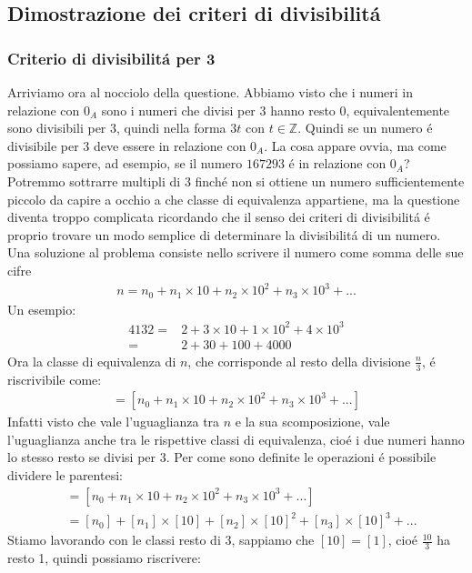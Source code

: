 \documentclass[twoside]{article} %
\begin{document}
	\subsection{Dimostrazione dei criteri di divisibilit\'a}
	\subsubsection{Criterio di divisibilit\'a per 3}
	Arriviamo ora al nocciolo della questione. Abbiamo visto che i numeri in relazione con $0_A$ sono i numeri che divisi per $3$ hanno resto 0, equivalentemente sono divisibili per $3$, quindi nella forma $3t$ con $t\in \mathbb{Z}$. Quindi se  un numero \'e divisibile per $3$ deve essere in relazione con $0_A$. La cosa appare ovvia, ma come possiamo sapere, ad esempio, se il numero $167293$ \'e in relazione con $0_A$? Potremmo sottrarre multipli di 3 finch\'e non si ottiene un numero sufficientemente piccolo da capire a occhio a che classe di equivalenza appartiene, ma la questione diventa troppo complicata ricordando che il senso dei criteri di divisibilit\'a \'e proprio trovare un modo semplice di determinare la divisibilit\'a di un numero. Una soluzione al problema consiste nello scrivere il numero come somma delle sue cifre
	\begin{gather*}
		n=n_0+n_1\times 10+n_2\times 10^2+n_3\times 10^3+...
	\end{gather*} 
	Un esempio:
	\begin{align*}
		4132=&2+3\times 10+1\times 10^2+4\times 10^3\\
		=&2+30+100+4000
	\end{align*} 
	Ora la classe di equivalenza di $n$, che corrisponde al resto della divisione $\frac{n}{3}$, \'e riscrivibile come:
	\begin{gather*}
		[n]=[n_0+n_1\times 10+n_2\times 10^2+n_3\times 10^3+...]
	\end{gather*}
	Infatti visto che vale l'uguaglianza tra $n$ e la sua scomposizione, vale l'uguaglianza anche tra le rispettive classi di equivalenza, cio\'e i due numeri hanno lo stesso resto se divisi per 3. Per come sono definite le operazioni \'e possibile dividere le parentesi:
	\begin{align*}
		[n]&=[n_0+n_1\times 10+n_2\times 10^2+n_3\times 10^3+...]\\
		&=[n_0]+[n_1]\times [10]+[n_2]\times [10]^2+[n_3]\times [10]^3+...
	\end{align*}
	Stiamo lavorando con le classi resto di $3$, sappiamo che $[10]=[1]$, cio\'e $\frac{10}{3}$ ha resto 1, quindi possiamo riscrivere:	
\end{document}
